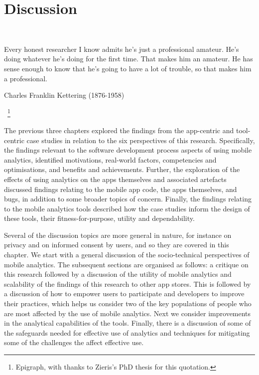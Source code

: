 \setchapterpreamble[u]{\margintoc}
\chapter{Discussion}~\label{chapter-discussion}

\epigraph{Every honest researcher I know admits he's just a professional amateur. He's doing whatever he's doing for the first time. That makes him an amateur. He has sense enough to know that he's going to have a lot of trouble, so that makes him a professional.}{Charles Franklin Kettering (1876-1958)}~\footnote{Epigraph, with thanks to Zieris's PhD thesis for this quotation\cite{zieris2020_phd_qualitative_analysis_of_knowledge_transfer_in_pair_programming}.}


The previous three chapters explored the findings from the app-centric and tool-centric case studies in relation to the six perspectives of this research. Specifically, the findings relevant to the software development process aspects of using mobile analytics, identified motivations, real-world factors, competencies and optimisations, and benefits and achievements. Further, the exploration of the effects of using analytics on the apps themselves and associated artefacts discussed findings relating to the mobile app code, the apps themselves, and bugs, in addition to some broader topics of concern. Finally, the findings relating to the mobile analytics tools described how the case studies inform the design of these tools, their fitness-for-purpose, utility and dependability. 

Several of the discussion topics are more general in nature, for instance on privacy and on informed consent by users, and so they are covered in this chapter. We start with a general discussion of the socio-technical perspectives of mobile analytics. The subsequent sections are organised as follows: a critique on this research followed by a discussion of the utility of mobile analytics and scalability of the findings of this research to other app stores. %
This is followed by a discussion of how to empower users to participate and developers to improve their practices, which helps us consider two of the key populations of people who are most affected by the use of mobile analytics. Next we consider improvements in the analytical capabilities of the tools. Finally, there is a discussion of some of the safeguards needed for effective use of analytics and techniques for mitigating some of the challenges the affect effective use.



